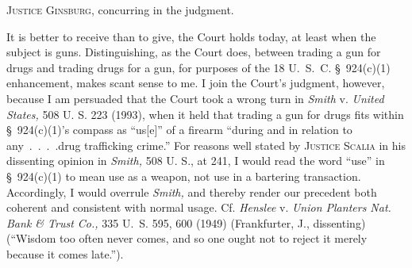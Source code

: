 
\setcounter{page}{84}

  \textsc{Justice Ginsburg,} concurring in the judgment.

  It is better to receive than to give, the Court holds today, at least
when the subject is guns. Distinguishing, as the Court does, between
trading a gun for drugs and trading drugs for a gun, for purposes of
the 18 U.~S.~C. \S~924(c)(1) enhancement, makes scant sense to me. I
join the Court's judgment, however, because I am persuaded that the
Court took a wrong turn in \emph{Smith} v. \emph{United States,} 508 U. S.
223 (1993), when it held that trading a gun for drugs fits within
\S~924(c)(1)'s compass as ``us[e]'' of a firearm ``during and in
relation to any~.~.~.~.drug trafficking crime.'' For reasons well
stated by \textsc{Justice Scalia} in his dissenting opinion in \emph{Smith,}
508 U. S., at 241, I would read the word ``use'' in \S~924(c)(1) to
mean use as a weapon, not use in a bartering transaction. Accordingly, I
would overrule \emph{Smith,} and thereby render our precedent both coherent
and consistent with normal usage. Cf. \emph{Henslee} v. \emph{Union Planters
Nat. Bank \& Trust Co.,} 335 U.~S. 595, 600 (1949) (Frankfurter, J.,
dissenting) (``Wisdom too often never comes, and so one ought not to
reject it merely because it comes late.'').
